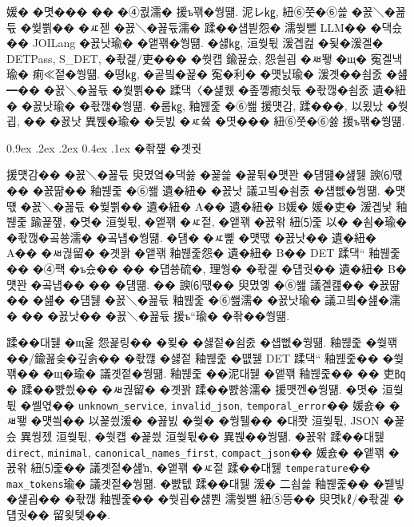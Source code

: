 \documentclass[10pt,twocolumn]{article}
\makeatletter
\renewcommand{\subsection}{\@startsection{subsection}{2}{\z@}%
{0.9ex \@plus .2ex \@minus .2ex}%
{0.4ex \@plus .1ex}%
{\normalfont\normalsize\bfseries}}
\makeatother
\begin{document}
媛� �몃��� �� �④퀎濡� 援ъ꽦�쒕떎. 泥レ㎏, 紐⑥쭛�⑥쓽 �꾨＼�꾪듃 �쒗쁽�� �ㅼ젣 �꾨＼�꾪듃濡� 蹂��섑븯怨� 濡쒖뺄 LLM�� �댁슜�� JOILang �꾨낫瑜� �앹꽦�쒕떎. �섏㎏, 洹쒖튃 湲곕컲 �됯�湲곌� DETPass, S\_DET, �좏겙/吏��� �쒓컙 鍮꾩슜, 怨쇨굅 �ㅽ뙣 �щ� 寃곌낵瑜� 痢≪젙�쒕떎. �뗭㎏, �곹빀�꾩� 寃�利� �먯닔瑜� 湲곗��쇰줈 �섎━�� �꾨＼�꾪듃 �쒗쁽�� 蹂댁〈�섍퀬 �좊꼫癒쇳듃 �좏깮�쇰줈 遺�紐� �꾨낫瑜� �좏깮�쒕떎. �룹㎏, 釉붾줉 �⑥쐞 援먯감, 蹂���, 以묐났 �쒓굅, �� �꾨낫 異붽�瑜� �듯빐 �ㅼ쓬 �몃��� 紐⑥쭛�⑥쓣 援ъ꽦�쒕떎.

\subsection{�좎쟾 �곗궛}

援먯감�� �꾨＼�꾪듃 臾몄옄�댁쓣 �꾩쓽 �꾩튂�먯꽌 �덈떒�섎뒗 諛⑹떇�� �꾨땲�� 釉붾줉 �⑥쐞 遺�紐� �꾨낫 議고빀�쇰줈 �섑뻾�쒕떎. �먯떇 �꾨＼�꾪듃 �쒗쁽�� 遺�紐� A�� 遺�紐� B媛� 媛�吏� 湲곕낯 釉붾줉 踰꾩쟾, �몃� 洹쒖튃, �앹꽦 �ㅼ젙, �앹꽦 �꾨왂 紐⑸줉 以� �쇰�瑜� �좏깮�곸쑝濡� �곸냽�쒕떎. �덈� �ㅼ뼱 �먯떇 �꾨낫�� 遺�紐� A�� �ㅽ궎留� �곗꽑 �앹꽦 釉붾줉怨� 遺�紐� B�� DET 蹂댁“ 釉붾줉�� �④퍡 �ъ슜�� �� �덉쑝硫�, 理쒕� �좏겙 �덉궛�� 遺�紐� B�먯꽌 �곸냽�� �� �덈떎. �� 諛⑹떇�� 臾몄옣 �⑥쐞 議곌컖�� �꾨땲�� �섎� �덈뒗 �꾨＼�꾪듃 釉붾줉 �⑥쐞濡� �꾨낫瑜� 議고빀�섎�濡� �� �꾨낫�� �꾨＼�꾪듃 援ъ“瑜� �좎��쒕떎.

蹂��대뒗 �щ윭 怨꾩링�� �묒� �섏젙�쇰줈 �섑뻾�쒕떎. 釉붾줉 �쒖꽦��/鍮꾪솢�깊솕�� �좏깮 �섏젙 釉붾줉 �먮뒗 DET 蹂댁“ 釉붾줉�� �쒖꽦�� �щ�瑜� 議곗젙�쒕떎. 釉붾줉 ��泥대뒗 �앹꽦 釉붾줉�� �� 吏㏃� 蹂��뺤씠�� �ㅽ궎留� �곗꽑 蹂��뺤쑝濡� 援먯껜�쒕떎. �몃� 洹쒖튃 �쎌엯�� \texttt{unknown\_service}, \texttt{invalid\_json}, \texttt{temporal\_error}�� 媛숈� �ㅽ뙣 �먯씤�� 以꾩씠湲� �꾪빐 �쒖� �쒕퉬�� �대쫫 洹쒖튃, JSON �꾩슜 異쒕젰 洹쒖튃, �쒓컙 �꾩씠 洹쒖튃�� 異붽��쒕떎. �꾨왂 蹂��대뒗 \texttt{direct}, \texttt{minimal}, \texttt{canonical\_names\_first}, \texttt{compact\_json}�� 媛숈� �앹꽦 �꾨왂 紐⑸줉�� 議곗젙�섎ŉ, �앹꽦 �ㅼ젙 蹂��대뒗 \texttt{temperature}�� \texttt{max\_tokens}瑜� 議곗젙�쒕떎. �뺤텞 蹂��대뒗 湲� 二쇱쓽 釉붾줉�� �붿빟�섍굅�� �좏깮 釉붾줉�� �쒓굅�섏뿬 濡쒖뺄 紐⑤뜽�� 臾몃㎘/�좏겙 �덉궛�� 留욎텣��.
\end{document}
